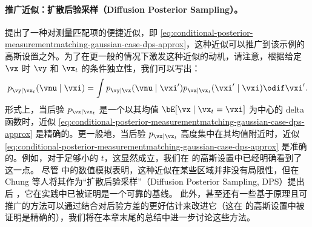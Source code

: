 \documentclass[../../book-main_zh.tex]{subfiles}
\begin{document}
\paragraph{推广近似：扩散后验采样（Diffusion Posterior Sampling）。}
 提出了一种对测量匹配项的便捷近似，即 \eqref{eq:conditional-posterior-measurementmatching-gaussian-case-dps-approx}，这种近似可以推广到该示例的高斯设置之外。为了在更一般的情况下激发这种近似的动机，请注意，根据给定 $\vx$ 时 $\vy$ 和 $\vx_t$ 的条件独立性，我们可以写出：
\begin{equation}
    p_{\vy \mid \vx_t}(\vnu \mid \vxi)
    =
    \int p_{\vy \mid \vx}(\vnu \mid \vxi') p_{\vx \mid \vx_t}(\vxi' \mid \vxi)
    \odif  \vxi'.
\end{equation}
形式上，当后验 $p_{\vx\mid \vx_t}$ 是一个以其均值 $\bE[\vx \mid \vx_t=\vxi]$ 为中心的 delta 函数时，近似 \eqref{eq:conditional-posterior-measurementmatching-gaussian-case-dps-approx} 是精确的。更一般地，当后验 $p_{\vx \mid \vx_t}$ 高度集中在其均值附近时，近似 \eqref{eq:conditional-posterior-measurementmatching-gaussian-case-dps-approx} 是准确的。例如，对于足够小的 $t$，这显然成立，我们在  的高斯设置中已经明确看到了这一点。
尽管  中的数值模拟表明，这种近似在某些区域并非没有局限性，但在 Chung 等人将其作为“扩散后验采样”（Diffusion Posterior Sampling, DPS）提出后 \cite{chung2023diffusion}，它在实践中已被证明是一个可靠的基线。
此外，甚至还有一些基于原理且可推广的方法可以通过结合对后验方差的更好估计来改进它（这在  的高斯设置中被证明是精确的），我们将在本章末尾的总结中进一步讨论这些方法。
\end{document}
